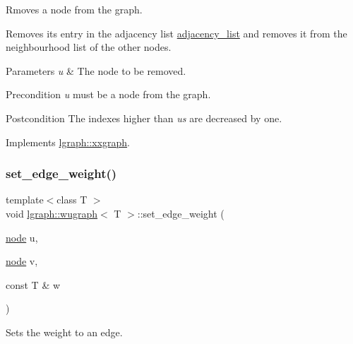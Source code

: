Rmoves a node from the graph. 

Removes its entry in the adjacency list \hyperlink{classlgraph_1_1xxgraph_a31cf82d0b20be05290be259dc97a51ec}{adjacency\+\_\+list} and removes it from the neighbourhood list of the other nodes.


\begin{DoxyParams}{Parameters}
{\em u} & The node to be removed. \\
\hline
\end{DoxyParams}
\begin{DoxyPrecond}{Precondition}
{\itshape u} must be a node from the graph. 
\end{DoxyPrecond}
\begin{DoxyPostcond}{Postcondition}
The indexes higher than {\itshape u\textquotesingle{}s} are decreased by one. 
\end{DoxyPostcond}


Implements \hyperlink{classlgraph_1_1xxgraph_a5b9e033f38a3ab34734be61aa9344c84}{lgraph\+::xxgraph}.

\mbox{\label{classlgraph_1_1wugraph_a6400d861723b555de718c6e7816b8a43}} 
\subsubsection{\texorpdfstring{set\+\_\+edge\+\_\+weight()}{set\_edge\_weight()}\hspace{0.1cm}{\footnotesize\ttfamily [1/2]}}
{\footnotesize\ttfamily template$<$class T $>$ \\
void \hyperlink{classlgraph_1_1wugraph}{lgraph\+::wugraph}$<$ T $>$\+::set\+\_\+edge\+\_\+weight (\begin{DoxyParamCaption}\item[{\hyperlink{namespacelgraph_a397169dd66adf725210a30fb7251773e}{node}}]{u,  }\item[{\hyperlink{namespacelgraph_a397169dd66adf725210a30fb7251773e}{node}}]{v,  }\item[{const T \&}]{w }\end{DoxyParamCaption})\hspace{0.3cm}{\ttfamily [virtual]}}



Sets the weight to an edge. 


